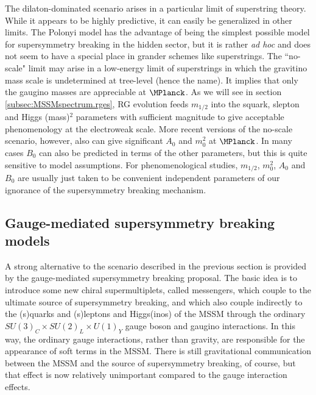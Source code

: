 The dilaton-dominated scenario arises in a particular limit of
superstring theory. While it appears to be highly predictive, it can
easily be generalized in other limits.\cite{stringsoft} The Polonyi model
has the advantage
of being the simplest possible model for supersymmetry breaking in the
hidden sector, but it is rather {\it ad hoc} and does not seem to
have a special place in grander schemes like superstrings. The ``no-scale"
limit may arise in a low-energy limit of superstrings
in which the gravitino mass scale is undetermined at tree-level (hence the
name).
It implies that only the gaugino masses are appreciable at $\MPlanck$.
As we will see in section \ref{subsec:MSSMspectrum.rges},
RG evolution feeds $m_{1/2}$ into the squark,
slepton and Higgs (mass)$^2$ parameters with sufficient magnitude
to give acceptable phenomenology at the electroweak scale.
More recent versions of the no-scale scenario, however, also can give
significant $A_0$ and $m_0^2$ at $\MPlanck$. In many cases $B_0$ can also
be predicted in terms of the other parameters, but this is quite
sensitive to model assumptions. For phenomenological studies,
$m_{1/2}$, $m_0^2$, $A_0$ and $B_0$ are usually just taken to be
convenient independent
parameters of our ignorance of the supersymmetry breaking mechanism.

\subsection{Gauge-mediated supersymmetry breaking
models}\label{subsec:origins.gmsb}

A strong alternative to the scenario described in the previous
section is provided by the gauge-mediated supersymmetry breaking
proposal.\cite{oldgmsb,newgmsb}
The basic idea is to introduce some new chiral supermultiplets,
called messengers, which couple to the ultimate
source of supersymmetry breaking, and which also couple indirectly
to the (s)quarks and (s)leptons and Higgs(inos) of the MSSM through the
ordinary $SU(3)_C\times
SU(2)_L\times U(1)_Y$ gauge boson and gaugino interactions.
In this way, the ordinary gauge interactions, rather than gravity, are
responsible for the
appearance of soft terms in the MSSM. There is still gravitational
communication between the MSSM and the source of supersymmetry breaking,
of course, but that effect is now relatively unimportant compared to the
gauge interaction effects.

